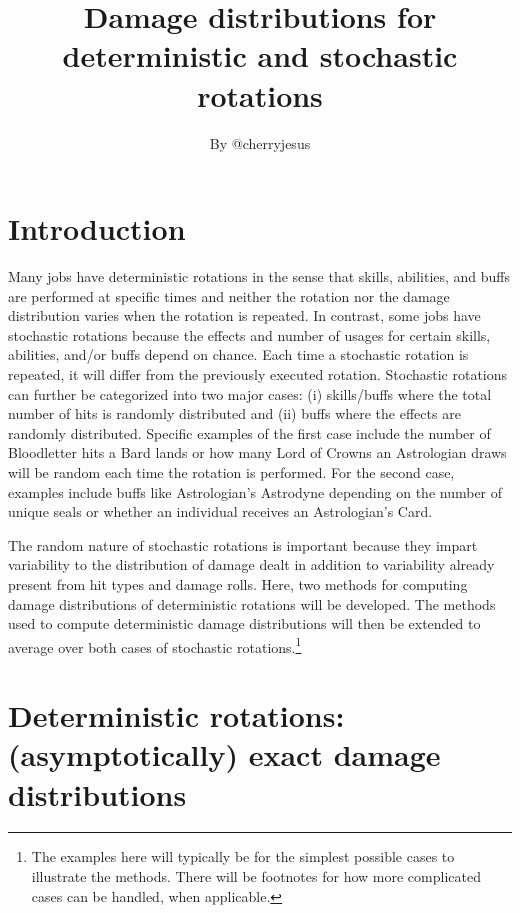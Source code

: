 \documentclass{article}
\begin{document}
    \title{Damage distributions for deterministic and stochastic rotations}
    \author{By @cherryjesus}
    \date{}
    \maketitle

    \section{Introduction}\label{sec:intro}

    Many jobs have deterministic rotations in the sense that skills, abilities, and buffs are performed at specific times and neither the rotation nor the damage distribution varies when the rotation is repeated. In contrast, some jobs have stochastic rotations because the effects and number of usages for certain skills, abilities, and/or buffs depend on chance. Each time a stochastic rotation is repeated, it will differ from the previously executed rotation. Stochastic rotations can further be categorized into two major cases: (i) skills/buffs where the total number of hits is randomly distributed and (ii) buffs where the effects are randomly distributed. Specific examples of the first case include the number of Bloodletter hits a Bard lands or how many Lord of Crowns an Astrologian draws will be random each time the rotation is performed. For the second case, examples include buffs like Astrologian's Astrodyne depending on the number of unique seals or whether an individual receives an Astrologian's Card. 
    
    The random nature of stochastic rotations is important because they impart variability to the distribution of damage dealt in addition to variability already present from hit types and damage rolls. Here, two methods for computing damage distributions of deterministic rotations will be developed. The methods used to compute deterministic damage distributions will then be extended to average over both cases of stochastic rotations.\footnote{The examples here will typically be for the simplest possible cases to illustrate the methods. There will be footnotes for how more complicated cases can be handled, when applicable.}

    \section{Deterministic rotations: (asymptotically) exact damage distributions}\label{sec:deterministic}
\end{document}
